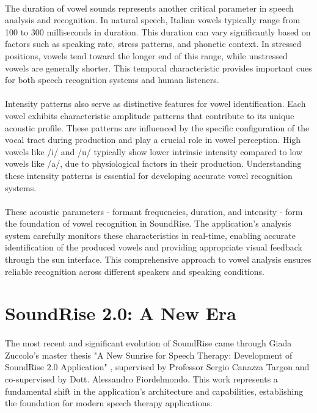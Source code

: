 \paragraph{}
The duration of vowel sounds represents another critical parameter in speech analysis and recognition. In natural speech, Italian vowels typically range from 100 to 300 milliseconds in duration. This duration can vary significantly based on factors such as speaking rate, stress patterns, and phonetic context. In stressed positions, vowels tend toward the longer end of this range, while unstressed vowels are generally shorter. This temporal characteristic provides important cues for both speech recognition systems and human listeners.

\paragraph{}
Intensity patterns also serve as distinctive features for vowel identification. Each vowel exhibits characteristic amplitude patterns that contribute to its unique acoustic profile. These patterns are influenced by the specific configuration of the vocal tract during production and play a crucial role in vowel perception. High vowels like /i/ and /u/ typically show lower intrinsic intensity compared to low vowels like /a/, due to physiological factors in their production. Understanding these intensity patterns is essential for developing accurate vowel recognition systems.

\paragraph{}
These acoustic parameters - formant frequencies, duration, and intensity - form the foundation of vowel recognition in SoundRise. The application's analysis system carefully monitors these characteristics in real-time, enabling accurate identification of the produced vowels and providing appropriate visual feedback through the sun interface. This comprehensive approach to vowel analysis ensures reliable recognition across different speakers and speaking conditions.

\section{SoundRise 2.0: A New Era}
\label{sec:soundrise-2}

\paragraph{}
The most recent and significant evolution of SoundRise came through Giada Zuccolo's master thesis "A New Sunrise for Speech Therapy: Development of SoundRise 2.0 Application" \cite{zuccolo2023}, supervised by Professor Sergio Canazza Targon and co-supervised by Dott. Alessandro Fiordelmondo. This work represents a fundamental shift in the application's architecture and capabilities, establishing the foundation for modern speech therapy applications.

